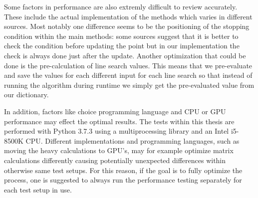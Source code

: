 \documentclass[a4paper,english,titlepage,12pt]{article}
\begin{document}
Some factors in performance are also extremly difficult to review accurately. These include the actual implementation of the methods which varies in different sources. Most notably one difference seems to be the positioning of the stopping condition within the main methods: some sources suggest that it is better to check the condition before updating the point but in our implementation the check is always done just after the update. Another optimization that could be done is the pre-calculation of line search values. This means that we pre-evaluate and save the values for each different input for each line search so that instead of running the algorithm during runtime we simply get the pre-evaluated value from our dictionary. \cite{book:convex_optimization} \cite{book:nonlinear_programming}

In addition, factors like choice programming language and CPU or GPU performance may effect the optimal results. The tests within this thesis are performed with Python 3.7.3 using a multiprocessing library and an Intel i5-8500K CPU. Different implementations and programming languages, such as moving the heavy calculations to GPU's, may for example optimize matrix calculations differently causing potentially unexpected differences within otherwise same test setups. For this reason, if the goal is to fully optimize the process, one is suggested to always run the performance testing separately for each test setup in use.




\end{document}
